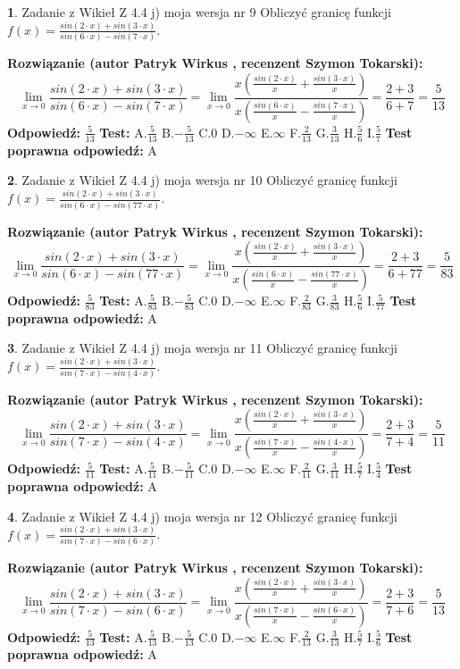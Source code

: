 \documentclass[12pt, a4paper]{article}
\theoremstyle{definition} %
\newtheorem{zad}{}
\newcommand{\zadStart}[1]{\begin{zad}#1\newline}
\newcommand{\zadStop}{\end{zad}}
\newcommand{\rozwStart}[2]{\noindent \textbf{Rozwiązanie (autor #1 , recenzent #2): }\newline}
\newcommand{\rozwStop}{\newline}
\newcommand{\odpStart}{\noindent \textbf{Odpowiedź:}\newline}
\newcommand{\odpStop}{\newline}
\newcommand{\testStart}{\noindent \textbf{Test:}\newline}
\newcommand{\testStop}{\newline}
\newcommand{\kluczStart}{\noindent \textbf{Test poprawna odpowiedź:}\newline}
\newcommand{\kluczStop}{\newline}
\begin{document}
\zadStart{Zadanie z Wikieł Z 4.4 j) moja wersja nr 9}
Obliczyć granicę funkcji $f(x)=\frac{sin(2\cdot x) +sin(3\cdot x)}{sin(6\cdot x) -sin(7\cdot x)}$.
\zadStop
\rozwStart{Patryk Wirkus}{Szymon Tokarski}
$$\lim\limits_{x\to 0}\frac{sin(2\cdot x) +sin(3\cdot x)}{sin(6\cdot x) -sin(7\cdot x)}=\lim\limits_{x\to 0}\frac{x(\frac{sin(2\cdot x)}{x}+\frac{sin(3\cdot x)}{x})}{x(\frac{sin(6\cdot x)}{x}-\frac{sin(7\cdot x)}{x})}=\frac{2+3}{6+7} = \frac{5}{13}$$
\rozwStop
\odpStart
$\frac{5}{13}$
\odpStop
\testStart
A.$\frac{5}{13}$
B.$-\frac{5}{13}$
C.$0$
D.$-\infty$
E.$\infty$
F.$\frac{2}{13}$
G.$\frac{3}{13}$
H.$\frac{5}{6}$
I.$\frac{5}{7}$
\testStop
\kluczStart
A
\kluczStop



\zadStart{Zadanie z Wikieł Z 4.4 j) moja wersja nr 10}
Obliczyć granicę funkcji $f(x)=\frac{sin(2\cdot x) +sin(3\cdot x)}{sin(6\cdot x) -sin(77\cdot x)}$.
\zadStop
\rozwStart{Patryk Wirkus}{Szymon Tokarski}
$$\lim\limits_{x\to 0}\frac{sin(2\cdot x) +sin(3\cdot x)}{sin(6\cdot x) -sin(77\cdot x)}=\lim\limits_{x\to 0}\frac{x(\frac{sin(2\cdot x)}{x}+\frac{sin(3\cdot x)}{x})}{x(\frac{sin(6\cdot x)}{x}-\frac{sin(77\cdot x)}{x})}=\frac{2+3}{6+77} = \frac{5}{83}$$
\rozwStop
\odpStart
$\frac{5}{83}$
\odpStop
\testStart
A.$\frac{5}{83}$
B.$-\frac{5}{83}$
C.$0$
D.$-\infty$
E.$\infty$
F.$\frac{2}{83}$
G.$\frac{3}{83}$
H.$\frac{5}{6}$
I.$\frac{5}{77}$
\testStop
\kluczStart
A
\kluczStop



\zadStart{Zadanie z Wikieł Z 4.4 j) moja wersja nr 11}
Obliczyć granicę funkcji $f(x)=\frac{sin(2\cdot x) +sin(3\cdot x)}{sin(7\cdot x) -sin(4\cdot x)}$.
\zadStop
\rozwStart{Patryk Wirkus}{Szymon Tokarski}
$$\lim\limits_{x\to 0}\frac{sin(2\cdot x) +sin(3\cdot x)}{sin(7\cdot x) -sin(4\cdot x)}=\lim\limits_{x\to 0}\frac{x(\frac{sin(2\cdot x)}{x}+\frac{sin(3\cdot x)}{x})}{x(\frac{sin(7\cdot x)}{x}-\frac{sin(4\cdot x)}{x})}=\frac{2+3}{7+4} = \frac{5}{11}$$
\rozwStop
\odpStart
$\frac{5}{11}$
\odpStop
\testStart
A.$\frac{5}{11}$
B.$-\frac{5}{11}$
C.$0$
D.$-\infty$
E.$\infty$
F.$\frac{2}{11}$
G.$\frac{3}{11}$
H.$\frac{5}{7}$
I.$\frac{5}{4}$
\testStop
\kluczStart
A
\kluczStop



\zadStart{Zadanie z Wikieł Z 4.4 j) moja wersja nr 12}
Obliczyć granicę funkcji $f(x)=\frac{sin(2\cdot x) +sin(3\cdot x)}{sin(7\cdot x) -sin(6\cdot x)}$.
\zadStop
\rozwStart{Patryk Wirkus}{Szymon Tokarski}
$$\lim\limits_{x\to 0}\frac{sin(2\cdot x) +sin(3\cdot x)}{sin(7\cdot x) -sin(6\cdot x)}=\lim\limits_{x\to 0}\frac{x(\frac{sin(2\cdot x)}{x}+\frac{sin(3\cdot x)}{x})}{x(\frac{sin(7\cdot x)}{x}-\frac{sin(6\cdot x)}{x})}=\frac{2+3}{7+6} = \frac{5}{13}$$
\rozwStop
\odpStart
$\frac{5}{13}$
\odpStop
\testStart
A.$\frac{5}{13}$
B.$-\frac{5}{13}$
C.$0$
D.$-\infty$
E.$\infty$
F.$\frac{2}{13}$
G.$\frac{3}{13}$
H.$\frac{5}{7}$
I.$\frac{5}{6}$
\testStop
\kluczStart
A
\kluczStop
\end{document}
